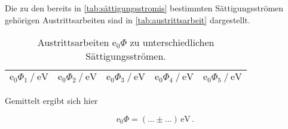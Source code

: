 Die zu den bereits in \autoref{tab:sättigungsstromis} bestimmten Sättigungsströmen gehörigen Austrittsarbeiten sind in \autoref{tab:austrittsarbeit} dargestellt.

\begin{table}
    \centering
    \caption{Austrittsarbeiten $\text{e}_0 \Phi$ zu unterschiedlichen Sättigungsströmen.}
    \label{tab:austrittsarbeit}
    \begin{tabular}{S S S S S}
        \toprule
        {$\text{e}_0\Phi_1 \mathbin{/} \unit{\eV}$} & {$\text{e}_0\Phi_2 \mathbin{/} \unit{\eV}$} & {$\text{e}_0\Phi_3 \mathbin{/} \unit{\eV}$} & {$\text{e}_0\Phi_4 \mathbin{/} \unit{\eV}$} & {$\text{e}_0\Phi_5 \mathbin{/} \unit{\eV}$}  \\
        \midrule




        \bottomrule
    \end{tabular}
\end{table}

Gemittelt ergibt sich hier

\begin{equation*}
    \text{e}_0 \Phi = (... \pm ...) \,\unit{\eV} \,.
\end{equation*}